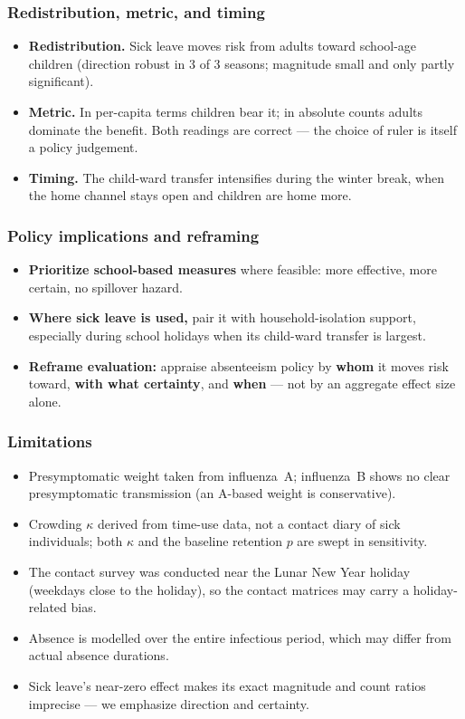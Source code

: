 \documentclass[dvipsnames, 10pt]{beamer}
\begin{document}
\begin{frame}\frametitle{Redistribution, metric, and timing}
    \begin{itemize}
        \item \textbf{Redistribution.} Sick leave moves risk from adults toward
              school-age children (direction robust in 3 of 3 seasons; magnitude
              small and only partly significant).
        \item \textbf{Metric.} In per-capita terms children bear it; in absolute
              counts adults dominate the benefit. Both readings are correct --- the
              choice of ruler is itself a policy judgement.
        \item \textbf{Timing.} The child-ward transfer intensifies during the
              winter break, when the home channel stays open and children are home
              more.
    \end{itemize}
\end{frame}

\begin{frame}\frametitle{Policy implications and reframing}
    \begin{itemize}
        \item \textbf{Prioritize school-based measures} where feasible: more
              effective, more certain, no spillover hazard.
        \item \textbf{Where sick leave is used,} pair it with household-isolation
              support, especially during school holidays when its child-ward
              transfer is largest.
        \item \textbf{Reframe evaluation:} appraise absenteeism policy by
              \textbf{whom} it moves risk toward, \textbf{with what certainty}, and
              \textbf{when} --- not by an aggregate effect size alone.
    \end{itemize}
\end{frame}

\begin{frame}\frametitle{Limitations}
    \begin{itemize}
        \item Presymptomatic weight taken from influenza~A; influenza~B shows no
              clear presymptomatic transmission (an A-based weight is conservative).
        \item Crowding $\kappa$ derived from time-use data, not a contact diary of
              sick individuals; both $\kappa$ and the baseline retention $p$ are
              swept in sensitivity.
        \item The contact survey was conducted near the Lunar New Year holiday
              (weekdays close to the holiday), so the contact matrices may carry a
              holiday-related bias.
        \item Absence is modelled over the entire infectious period, which may
              differ from actual absence durations.
        \item Sick leave's near-zero effect makes its exact magnitude and count
              ratios imprecise --- we emphasize direction and certainty.
    \end{itemize}
\end{frame}
\end{document}
